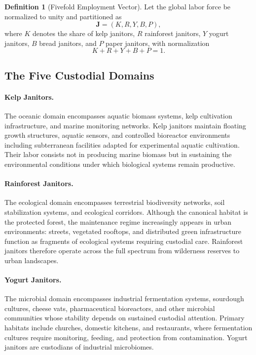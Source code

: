 \documentclass[12pt,a4paper]{article}
\theoremstyle{plain}
\theoremstyle{definition}
\newtheorem{definition}[theorem]{Definition}
\theoremstyle{remark}
\begin{document}
\begin{definition}[Fivefold Employment Vector]
Let the global labor force be normalized to unity and partitioned as
\[
\mathbf{J} = (K, R, Y, B, P),
\]
where $K$ denotes the share of kelp janitors, $R$ rainforest janitors, $Y$
yogurt janitors, $B$ bread janitors, and $P$ paper janitors, with
normalization
\[
K + R + Y + B + P = 1.
\]
\end{definition}

\subsection{The Five Custodial Domains}

\paragraph{Kelp Janitors.}
The oceanic domain encompasses aquatic biomass systems, kelp cultivation
infrastructure, and marine monitoring networks.  Kelp janitors maintain
floating growth structures, aquatic sensors, and controlled bioreactor
environments including subterranean facilities adapted for experimental
aquatic cultivation.  Their labor consists not in producing marine biomass
but in sustaining the environmental conditions under which biological systems
remain productive.

\paragraph{Rainforest Janitors.}
The ecological domain encompasses terrestrial biodiversity networks, soil
stabilization systems, and ecological corridors.  Although the canonical
habitat is the protected forest, the maintenance regime increasingly appears
in urban environments: streets, vegetated rooftops, and distributed green
infrastructure function as fragments of ecological systems requiring custodial
care.  Rainforest janitors therefore operate across the full spectrum from
wilderness reserves to urban landscapes.

\paragraph{Yogurt Janitors.}
The microbial domain encompasses industrial fermentation systems, sourdough
cultures, cheese vats, pharmaceutical bioreactors, and other microbial
communities whose stability depends on sustained custodial attention.  Primary
habitats include churches, domestic kitchens, and restaurants, where
fermentation cultures require monitoring, feeding, and protection from
contamination.  Yogurt janitors are custodians of industrial microbiomes.
\end{document}
